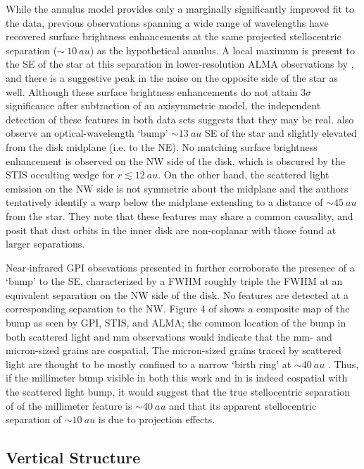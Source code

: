 \documentclass[modern]{aastex62}
\begin{document}
While the annulus model provides only a marginally significantly improved fit to the data, previous observations spanning a wide range of wavelengths have recovered surface brightness enhancements at the same projected stellocentric separation ($\sim~\SI{10}{au}$) as the hypothetical annulus.
A local maximum is present to the SE of the star at this separation in lower-resolution ALMA observations by \cite{macgregor13}, and there is a suggestive peak in the noise on the opposite side of the star as well.
Although these surface brightness enhancements do not attain $3 \sigma$ significance after subtraction of an axisymmetric model, the independent detection of these features in both data sets suggests that they may be real.  
\cite{schneider14} also observe an optical-wavelength `bump' $\sim \SI{13}{au}$ SE of the star and slightly elevated from the disk midplane (i.e. to the NE).
No matching surface brightness enhancement is observed on the NW side of the disk, which is obscured by the STIS occulting wedge for $r \lesssim \SI{12}{au}$.
On the other hand, the scattered light emission on the NW side is not symmetric about the midplane and the authors tentatively identify a warp below the midplane extending to a distance of $\sim \SI{45}{au}$ from the star.
They note that these features may share a common causality, and posit that dust orbits in the inner disk are non-coplanar with those found at larger separations.

Near-infrared GPI obsevations presented in \cite{wang15} further corroborate the presence of a `bump' to the SE, characterized by a FWHM roughly triple the FWHM at an equivalent separation on the NW side of the disk. 
No features are detected at a corresponding separation to the NW.
Figure 4 of \cite{wang15} shows a composite map of the bump as seen by GPI, STIS, and ALMA; the common location of the bump in both scattered light and mm observations would indicate that the mm- and micron-sized grains are cospatial.
The micron-sized grains traced by scattered light are thought to be mostly confined to a narrow `birth ring' at $\sim \SI{40}{au}$ \citep{strubbe&chiang06}. 
Thus, if the millimeter bump visible in both this work and in \cite{macgregor13} is indeed cospatial with the scattered light bump, it would suggest that the true stellocentric separation of of the millimeter feature is $\sim \SI{40}{au}$ and that its apparent stellocentric separation of $\sim \SI{10}{au}$ is due to projection effects.

\subsection{Vertical Structure}
\label{subsection: vertical discussion}
\end{document}

